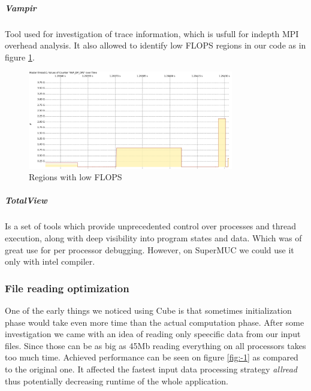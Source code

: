 \documentclass{article}
\begin{document}
\subparagraph{Vampir}
Tool used for investigation of trace information, which is usfull for indepth MPI overhead analysis. It also allowed to identify low FLOPS regions in our code as in figure \ref{fig:7}.
\begin{figure}[h!]
	\begin{center}
		\includegraphics[width=0.8\textwidth]{iter-pent-dual-allread-8-Counter_Data_Timeline_traces.png}
		\caption{Regions with low FLOPS}
		\label{fig:7}
	\end{center}
\end{figure}

\subparagraph{TotalView}
Is a set of tools which provide unprecedented control over processes and thread execution, along with deep visibility into program states and data. Which was of great use for per processor debugging. However, on SuperMUC we could use it only with intel compiler.

\subsubsection{File reading optimization}
One of the early things we noticed using Cube is that sometimes initialization phase would take even more time than the actual computation phase. After some investigation we came with an idea of reading only speecific data from our input files. Since those can be as big as 45Mb reading everything on all processors takes too much time. Achieved performance can be seen on figure \ref{fig:-1} as compared to the original one. It affected the fastest input data processing strategy \textit{allread} thus potentially decreasing runtime of the whole application.
\end{document}
